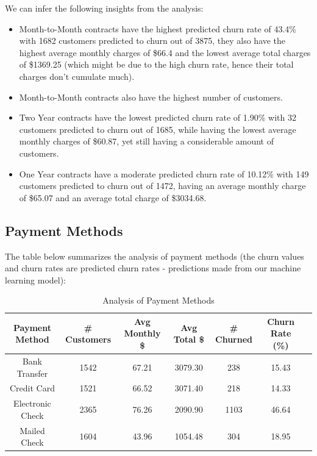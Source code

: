 \documentclass{article}
\theoremstyle{mytheoremstyle}
\theoremstyle{mytheoremstyle}
\theoremstyle{myproblemstyle}
\begin{document}
We can infer the following insights from the analysis:
\begin{itemize}
    \item Month-to-Month contracts have the highest predicted churn rate of 43.4\% with 1682 customers predicted to churn out of 3875, they also have the highest average monthly charges of \$66.4 and the lowest average total charges of \$1369.25 (which might be due to the high churn rate, hence their total charges don't cumulate much).
    \item Month-to-Month contracts also have the highest number of customers.
    \item Two Year contracts have the lowest predicted churn rate of 1.90\% with 32 customers predicted to churn out of 1685, while having the lowest average monthly charges of \$60.87, yet still having a considerable amount of customers.
    \item One Year contracts have a moderate predicted churn rate of 10.12\% with 149 customers predicted to churn out of 1472, having an average monthly charge of \$65.07 and an average total charge of \$3034.68.
\end{itemize}


\subsection{Payment Methods}
The table below summarizes the analysis of payment methods (the churn values and churn rates are predicted churn rates - predictions made from our machine learning model):

\begin{table}[H]
    \centering
    \begin{tabular}{|c|c|c|c|c|c|c|}
        \hline
        \textbf{Payment Method} & \textbf{\# Customers} & \textbf{Avg Monthly \$} & \textbf{Avg Total \$} & \textbf{\# Churned} & \textbf{Churn Rate (\%)} \\
        \hline
        Bank Transfer & 1542 & 67.21 & 3079.30 & 238 & 15.43 \\
        Credit Card & 1521 & 66.52 & 3071.40 & 218 & 14.33 \\
        Electronic Check & 2365 & 76.26 & 2090.90 & 1103 & 46.64 \\
        Mailed Check & 1604 & 43.96 & 1054.48 & 304 & 18.95 \\
        \hline
    \end{tabular}
    \caption{Analysis of Payment Methods}
\end{table}
\end{document}
